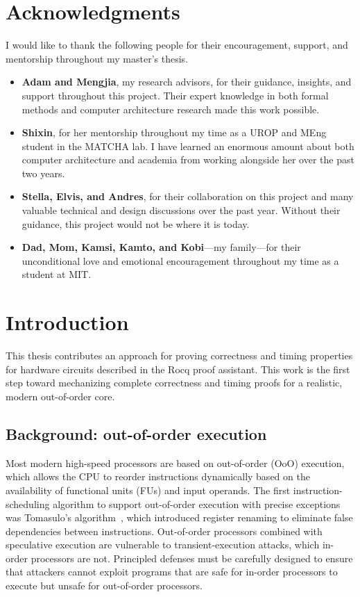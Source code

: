 \documentclass[fontset=fira-newtxsf]{mitthesis}
\theoremstyle{definition}
\theoremstyle{plain}
\begin{document}
\chapter*{Acknowledgments}
I would like to thank the following people for their encouragement, support, and mentorship throughout my master's thesis.
\begin{itemize}
  \item \textbf{Adam and Mengjia}, my research advisors, for their guidance, insights, and support throughout this project.
  Their expert knowledge in both formal methods and computer architecture research made this work possible.

  \item \textbf{Shixin}, for her mentorship throughout my time as a UROP and MEng student in the MATCHA lab.
  I have learned an enormous amount about both computer architecture and academia from working alongside her over the past two years.

  \item \textbf{Stella, Elvis, and Andres}, for their collaboration on this project and many valuable technical and design discussions over the past year. Without their guidance, this project would not be where it is today.

  \item \textbf{Dad, Mom, Kamsi, Kamto, and Kobi}---my family---for their unconditional love and emotional encouragement throughout my time as a student at MIT.
\end{itemize}

\tableofcontents
\listoffigures
\listoftables

\chapter{Introduction} \label{chap:intro}
This thesis contributes an approach for proving correctness and timing properties for hardware circuits described in the Rocq proof assistant.
This work is the first step toward mechanizing complete correctness and timing proofs for a realistic, modern out-of-order core.

\section{Background: out-of-order execution} \label{sec:ooo}
Most modern high-speed processors are based on out-of-order (OoO) execution, which allows the CPU to reorder instructions dynamically based on the availability of functional units (FUs) and input operands.
The first instruction-scheduling algorithm to support out-of-order execution with precise exceptions was Tomasulo's algorithm~\cite{tomasulo1967}, which introduced register renaming to eliminate false dependencies between instructions.
Out-of-order processors combined with speculative execution are vulnerable to transient-execution attacks, which in-order processors are not.
Principled defenses must be carefully designed to ensure that attackers cannot exploit programs that are safe for in-order processors to execute but unsafe for out-of-order processors.
\end{document}
